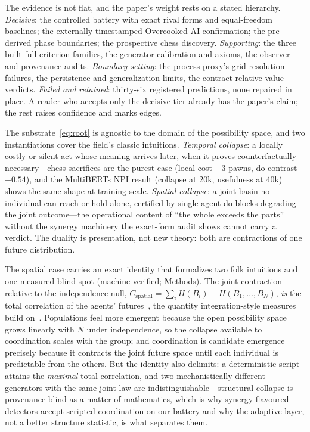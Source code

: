 \documentclass[11pt]{article}
\theoremstyle{definition}
\begin{document}
The evidence is not flat, and the paper's weight rests on a stated
hierarchy. \emph{Decisive}: the controlled battery with exact rival
forms and equal-freedom baselines; the externally timestamped
Overcooked-AI confirmation; the pre-derived phase boundaries; the
prospective chess discovery. \emph{Supporting}: the three built
full-criterion families, the generator calibration and axioms, the
observer and provenance audits. \emph{Boundary-setting}: the process
proxy's grid-resolution failures, the persistence and generalization
limits, the contract-relative value verdicts. \emph{Failed and
retained}: thirty-six registered predictions, none repaired in place.
A reader who accepts only the decisive tier already has the paper's
claim; the rest raises confidence and marks edges.

The substrate~\eqref{eq:root} is agnostic to the domain of the
possibility space, and two instantiations cover the field's classic
intuitions. \emph{Temporal collapse}: a locally costly or silent act
whose meaning arrives later, when it proves counterfactually
necessary---chess sacrifices are the purest case (local cost $-3$
pawns, do-contrast $+0.54$), and the MultiBERTs NPI result (collapse
at 20k, usefulness at 40k) shows the same shape at training scale.
\emph{Spatial collapse}: a joint basin no individual can reach or hold
alone, certified by single-agent do-blocks degrading the joint
outcome---the operational content of ``the whole exceeds the parts''
without the synergy machinery the exact-form audit shows cannot carry
a verdict. The duality is presentation, not new theory: both are
contractions of one future distribution.

The spatial case carries an exact identity that formalizes two folk
intuitions and one measured blind spot (machine-verified; Methods).
The joint contraction relative to the independence null,
$C_{\mathrm{spatial}} = \sum_i H(B_i) - H(B_1,\dots,B_N)$, \emph{is}
the total correlation of the agents' futures~\cite{watanabe1960,
mcgill1954}, the quantity integration-style measures build
on~\cite{tononi1994}. Populations feel more emergent because the open
possibility space grows linearly with $N$ under independence, so the
collapse available to coordination scales with the group; and
coordination is candidate emergence precisely because it contracts
the joint future space until each individual is predictable from the
others. But the identity also delimits: a deterministic script
attains the \emph{maximal} total correlation, and two mechanistically
different generators with the same joint law are
indistinguishable---structural collapse is provenance-blind as a
matter of mathematics, which is why synergy-flavoured detectors
accept scripted coordination on our battery and why the adaptive
layer, not a better structure statistic, is what separates them.
\end{document}
